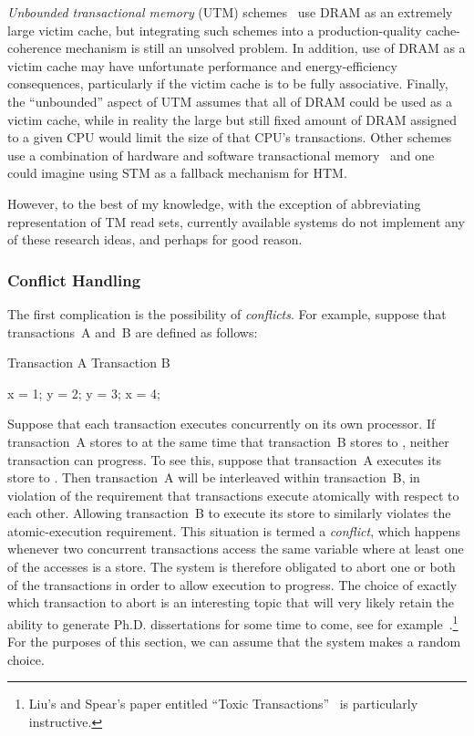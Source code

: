 \emph{Unbounded transactional memory} (UTM)
schemes~\cite{CScottAnanian2006,KevinEMoore2006}
use DRAM as an extremely large victim cache, but integrating such schemes
into a production-quality cache-coherence mechanism is still an unsolved
problem.
In addition, use of DRAM as a victim cache may have unfortunate
performance and energy-efficiency consequences, particularly
if the victim cache is to be fully associative.
Finally, the ``unbounded'' aspect of UTM assumes that all of DRAM
could be used as a victim cache, while in reality
the large but still fixed amount of DRAM assigned to a given CPU
would limit the size of that CPU's transactions.
Other schemes use a combination of hardware and software transactional
memory~\cite{SanjeevKumar2006} and one could imagine using STM as a
fallback mechanism for HTM\@.

However, to the best of my knowledge, with the exception of abbreviating
representation of TM read sets, currently available systems do not
implement any of these research ideas, and perhaps for good reason.

\subsubsection{Conflict Handling}
\label{sec:future:Conflict Handling}

The first complication is the possibility of \emph{conflicts}.
For example, suppose that transactions~A and~B are defined as follows:

\begin{VerbatimU}
Transaction A       Transaction B

x = 1;              y = 2;
y = 3;              x = 4;
\end{VerbatimU}

Suppose that each transaction executes concurrently on its own processor.
If transaction~A stores to  at the same time that transaction~B
stores to , neither transaction can progress.
To see this, suppose that transaction~A executes its store to .
Then transaction~A will be interleaved within transaction~B, in violation
of the requirement that transactions execute atomically with respect to
each other.
Allowing transaction~B to execute its store to  similarly violates
the atomic-execution requirement.
This situation is termed a \emph{conflict}, which happens whenever two
concurrent transactions access the same variable where at least one of
the accesses is a store.
The system is therefore obligated to abort one or both of the transactions
in order to allow execution to progress.
The choice of exactly which transaction to abort is an interesting topic
that will very likely retain the ability to generate Ph.D. dissertations for
some time to come, see for
example~\cite{EgeAkpinar2011HTM2TLE}.\footnote{
	Liu's and Spear's paper entitled ``Toxic
	Transactions''~\cite{YujieLiu2011ToxicTransactions} is
	particularly instructive.}
For the purposes of this section, we can assume that the system makes
a random choice.

